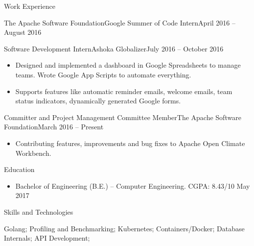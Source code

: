\documentclass[]{mcdowellcv}
\begin{document}
\begin{cvsection}{Work Experience}
\begin{cvsubsection}{The Apache Software Foundation}{Google Summer of Code Intern}{April 2016 -- August 2016}
\begin{itemize}
			\end{itemize}
		\end{cvsubsection}
		\begin{cvsubsection}{Software Development Intern}{Ashoka Globalizer}{July 2016 -- October 2016}
			\begin{itemize}
				\item Designed and implemented a dashboard in Google Spreadsheets to manage teams. Wrote Google App Scripts to automate everything.
				\item Supports features like automatic reminder emails, welcome emails, team status indicators, dynamically generated Google forms.
			\end{itemize}
		\end{cvsubsection}
		\begin{cvsubsection}[2]{Committer and Project Management Committee Member}{The Apache Software Foundation}{March 2016 -- Present}
			\begin{itemize}
				\item Contributing features, improvements and bug fixes to Apache Open Climate Workbench.
			\end{itemize}
		\end{cvsubsection}
	\end{cvsection}
	\begin{cvsection}{Education}
		\begin{cvsubsection}{}{}{}
			\begin{itemize}
				\item Bachelor of Engineering (B.E.) -- Computer Engineering. CGPA: 8.43/10 \hfill May 2017
			\end{itemize}
		\end{cvsubsection}
	\end{cvsection}
	\begin{cvsection}{Skills and Technologies}
		\begin{cvsubsection}{}{}{}	
			   Golang; Profiling and Benchmarking; Kubernetes; Containers/Docker; Database Internals; API Development;
		\end{cvsubsection}
	\end{cvsection}
	
\end{document}
